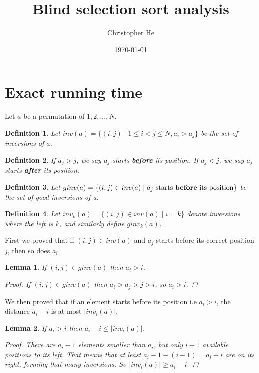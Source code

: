 \documentclass{article}
\title{Blind selection sort analysis}
\author{Christopher He}
\date{\today}
\newtheorem{lemma}{Lemma}
\newtheorem{definition}{Definition}
\begin{document}
\maketitle
\section{Exact running time}

Let $a$ be a permutation of $1,2, ..., N$.
\begin{definition}
    Let $inv(a) = \{(i, j) \mid 1 \leq i < j \leq N, a_i > a_j \}$ be the set of inversions of $a$.
\end{definition}

\begin{definition}
    If $a_j > j$, we say $a_j$ starts \textbf{before} its position.
    If $a_j < j$, we say $a_j$ starts \textbf{after} its position.
\end{definition}

\begin{definition}
    Let $ginv(a) = \{(i, j) \in inv(a) \mid \text{$a_j$ starts \textbf{before} its position} \}$
    be the set of good inversions of a.
\end{definition}

\begin{definition}
    Let $inv_k(a) = \{(i, j) \in inv(a) \mid i = k\}$ denote inversions where the left is $k$,
    and similarly define $ginv_k(a)$.
\end{definition}

First we proved that if $(i, j) \in inv(a)$ and $a_j$ starts before its correct position $j$, then
so does $a_i$.

\begin{lemma}
    If $(i, j) \in ginv(a)$ then $a_i > i$.
    \begin{proof}
        If $(i, j) \in ginv(a)$ then $a_i > a_j > j > i$, so $a_i > i$.
    \end{proof}
\end{lemma}

We then proved that if an element starts before its position i.e $a_i > i$, the distance $a_i - i$ is 
at most $\vert inv_i(a) \vert$.

\begin{lemma} If $a_i > i$ then $a_i - i \leq \vert inv_i(a) \vert$.
    \begin{proof} There are $a_i - 1$ elements smaller than $a_i$, but only $i - 1$ available positions to its left. That means that at least $a_i - 1 - (i - 1) = a_i - i $ are on its right, forming that many inversions. So $ \vert inv_i(a) \vert \geq a_i - i$.
    \end{proof}
\end{lemma}
\end{document}
